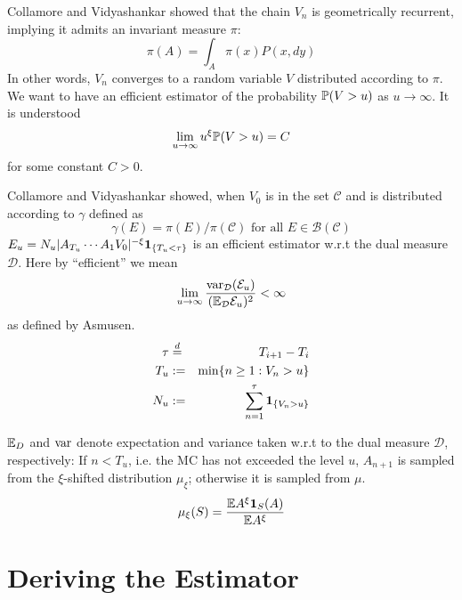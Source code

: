 \documentclass{beamer}
\begin{document}
\begin{frame}
  Collamore and Vidyashankar \cite{Collamore20133378} showed that the
  chain $V_n$ is geometrically recurrent, implying it admits an invariant
  measure $\pi$:
  \[
  \pi(A) = \int_A \pi(x) P(x, dy)
  \]
  In other words, $V_n$ converges to a random variable $V$ distributed
  according to $\pi$. We want to have an efficient estimator of the
  probability $\P(V > u)$ as $u \to \infty$. It is understood
  \[
   \lim_{u \to \infty} u^\xi \P(V > u) = C
  \]
  for some constant $C > 0$.
\end{frame}

\begin{frame}
  Collamore and Vidyashankar showed, when $V_0$ is in the set
  $\mathcal C$ and is distributed according to $\gamma$ defined as
  \[
  \gamma(E) = \pi(E)/\pi(\mathcal C)\text{ for all } E \in \mathcal B(\mathcal C)
  \]
  $E_u = N_u |A_{T_u} \cdots A_{1} V_0|^{-\xi}\1{T_u < \tau}$ is an efficient
  estimator w.r.t the dual measure $\mathcal D$. Here by ``efficient'' we mean
  \[
  \lim_{u \to \infty} {
    \var_{\mathcal D}(\mathcal E_u)
    \over
    (\E_{\mathcal D} \mathcal E_u)^2
  } < \infty
  \]
  as defined by Asmusen. 
  \begin{eqnarray*}
    \tau &\overset{d}{=}& T_{i+1} - T_i \\
    T_u &:=& \min\{n \geq 1: V_n > u\} \\
    N_u &:=& \sum_{n=1}^{\tau} \1{V_n > u}
  \end{eqnarray*}
\end{frame}

\begin{frame}
  $\E_D$ and $\var$ denote expectation and variance taken w.r.t to the
  dual measure $\mathcal D$, respectively: If $n < T_u$, i.e. the MC
  has not exceeded the level $u$, $A_{n+1}$ is sampled from the
  $\xi$-shifted distribution $\mu_\xi$; otherwise it is sampled from
  $\mu$.
  \[
  \mu_\xi (S) = {\E A^\xi \I{S}(A)
    \over
    \E A^\xi
    }
  \]
\end{frame}


\section{Deriving the Estimator}


\end{document}
